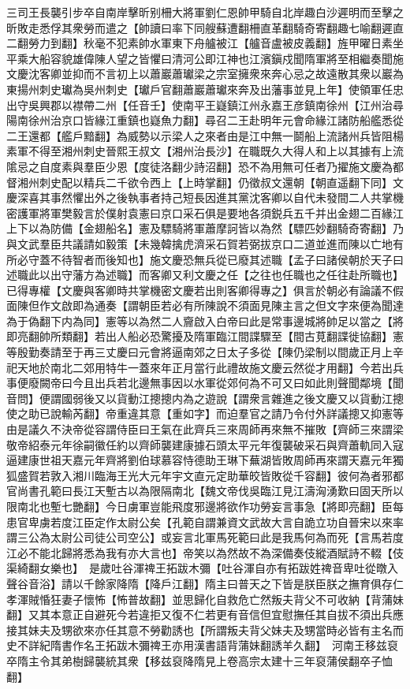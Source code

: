 三司王長襲引步卒自南岸擊昕别柵大將軍劉仁恩帥甲騎自北岸趣白沙遲明而至擊之昕敗走悉俘其衆勞而遣之【帥讀曰率下同艘蘇遭翻柵直革翻騎奇寄翻趣七喻翻遲直二翻勞力到翻】秋毫不犯素帥水軍東下舟艫被江【艫音盧被皮義翻】旌甲曜日素坐平乘大船容貌雄偉陳人望之皆懼曰清河公即江神也江濱鎭戍聞隋軍將至相繼奏聞施文慶沈客卿並抑而不言初上以蕭巖蕭瓛梁之宗室擁衆來奔心忌之故遠散其衆以巖為東揚州刺史瓛為吳州刺史【瓛戶官翻蕭巖蕭瓛來奔及出藩事並見上年】使領軍任忠出守吳興郡以襟帶二州【任音壬】使南平王嶷鎮江州永嘉王彦鎮南徐州【江州治尋陽南徐州治京口皆緣江重鎮也嶷魚力翻】尋召二王赴明年元會命緣江諸防船艦悉從二王還都【艦戶黯翻】為威勢以示梁人之來者由是江中無一鬬船上流諸州兵皆阻楊素軍不得至湘州刺史晉熙王叔文【湘州治長沙】在職既久大得人和上以其據有上流隂忌之自度素與羣臣少恩【度徒洛翻少詩沼翻】恐不為用無可任者乃擢施文慶為都督湘州刺史配以精兵二千欲令西上【上時掌翻】仍徵叔文還朝【朝直遥翻下同】文慶深喜其事然懼出外之後執事者持己短長因進其黨沈客卿以自代未發間二人共掌機密護軍將軍樊毅言於僕射袁憲曰京口采石俱是要地各須鋭兵五千并出金翅二百緣江上下以為防備【金翅船名】憲及驃騎將軍蕭摩訶皆以為然【驃匹妙翻騎奇寄翻】乃與文武羣臣共議請如毅策【未幾韓擒虎濟采石賀若弼拔京口二道並進而陳以亡地有所必守蓋不待智者而後知也】施文慶恐無兵從已廢其述職【孟子曰諸侯朝於天子曰述職此以出守藩方為述職】而客卿又利文慶之任【之往也任職也之任往赴所職也】已得專權【文慶與客卿時共掌機密文慶若出則客卿得專之】俱言於朝必有論議不假面陳但作文啟即為通奏【謂朝臣若必有所陳說不須面見陳主言之但文字來便為聞達為于偽翻下内為同】憲等以為然二人齎啟入白帝曰此是常事邊城將帥足以當之【將即亮翻帥所類翻】若出人船必恐驚擾及隋軍臨江間諜驟至【間古莧翻諜徙協翻】憲等殷勤奏請至于再三丈慶曰元會將逼南郊之日太子多從【陳仍梁制以間歲正月上辛祀天地於南北二郊用特牛一蓋來年正月當行此禮故施文慶云然從才用翻】今若出兵事便廢闕帝曰今且出兵若北邊無事因以水軍從郊何為不可又曰如此則聲聞鄰境【聞音問】便謂國弱後又以貨動江摠摠内為之遊說【謂衆言雜進之後文慶又以貨動江摠使之助已說輸芮翻】帝重違其意【重如字】而迫羣官之請乃令付外詳議摠又抑憲等由是議久不決帝從容謂侍臣曰王氣在此齊兵三來周師再來無不摧敗【齊師三來謂梁敬帝紹泰元年徐嗣徽任約以齊師襲建康據石頭太平元年復襲破采石與齊蕭軌同入寇逼建康世祖天嘉元年齊將劉伯球慕容恃德助王琳下蕪湖皆敗周師再來謂天嘉元年獨狐盛賀若敦入湘川臨海王光大元年宇文直元定助華皎皆敗從千容翻】彼何為者邪都官尚書孔範曰長江天塹古以為限隔南北【魏文帝伐吳臨江見江濤洶湧歎曰固天所以限南北也塹七艷翻】今日虜軍豈能飛度邪邊將欲作功勞妄言事急【將即亮翻】臣每患官卑虜若度江臣定作太尉公矣【孔範自謂兼資文武故大言自詭立功自晉宋以來率謂三公為太尉公司徒公司空公】或妄言北軍馬死範曰此是我馬何為而死【言馬若度江必不能北歸將悉為我有亦大言也】帝笑以為然故不為深備奏伎縱酒賦詩不輟【伎渠綺翻女樂也】　是歲吐谷渾禆王拓跋木彌【吐谷渾自亦有拓跋姓禆音卑吐從暾入聲谷音浴】請以千餘家降隋【降戶江翻】隋主曰普天之下皆是朕臣朕之撫育俱存仁孝渾賊惛狂妻子懷怖【怖普故翻】並思歸化自救危亡然叛夫背父不可收納【背蒲妹翻】又其本意正自避死今若違拒又復不仁若更有音信但宜慰撫任其自拔不須出兵應接其妹夫及甥欲來亦任其意不勞勸誘也【所謂叛夫背父妹夫及甥當時必皆有主名而史不詳紀隋書作名王拓跋木彌禆王亦用漢書語背蒲妹翻誘羊久翻】　河南王移兹裒卒隋主令其弟樹歸襲統其衆【移兹裒降隋見上卷高宗太建十三年裒蒲侯翻卒子恤翻】

